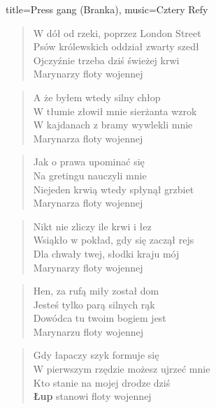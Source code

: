 \newpage
\begin{song}{title={Press gang (Branka)}, music={Cztery Refy}}
\begin{multicols}{2}
    \begin{verse}
        W dół od rzeki, poprzez London Street \\
        Psów królewskich oddział zwarty szedł \\
        Ojczyźnie trzeba dziś świeżej krwi \\
        Marynarzy floty wojennej
    \end{verse}
    \begin{verse}
        A że byłem wtedy silny chłop\\
        W tłumie złowił mnie sierżanta wzrok \\
        W kajdanach z bramy wywlekli mnie \\
        Marynarza floty wojennej
    \end{verse}
    \begin{verse}
        Jak o prawa upominać się \\
        Na gretingu nauczyli mnie \\
        Niejeden krwią wtedy spłynął grzbiet \\
        Marynarza floty wojennej
    \end{verse}
    \begin{verse}
        Nikt nie zliczy ile krwi i łez \\
        Wsiąkło w pokład, gdy się zaczął rejs \\
        Dla chwały twej, słodki kraju mój \\
        Marynarzy floty wojennej
    \end{verse}
    \begin{verse}
        Hen, za rufą miły został dom \\
        Jesteś tylko parą silnych rąk \\
        Dowódca tu twoim bogiem jest \\
        Marynarzu floty wojennej
    \end{verse}
    \begin{verse}
        Gdy łapaczy szyk formuje się \\
        W pierwszym rzędzie możesz ujrzeć mnie \\
        Kto stanie na mojej drodze dziś \\
        \textbf{Łup} stanowi floty wojennej
    \end{verse}
\end{multicols}
\end{song}
